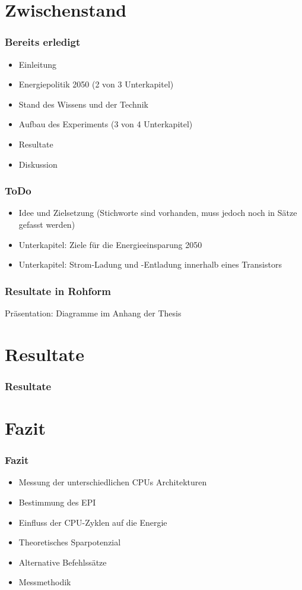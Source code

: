 \documentclass{beamer}
\begin{document}
\section{Zwischenstand} 
\begin{frame}
\frametitle{Bereits erledigt}
\begin{itemize}
\item Einleitung
\item Energiepolitik 2050 (2 von 3 Unterkapitel)
\item Stand des Wissens und der Technik
\item Aufbau des Experiments (3 von 4 Unterkapitel)
\item Resultate
\item Diskussion
\end{itemize}
\end{frame}



\begin{frame}
\frametitle{ToDo}
\begin{itemize}
\item Idee und Zielsetzung (Stichworte sind vorhanden, muss jedoch noch in Sätze gefasst werden)
\item Unterkapitel: Ziele für die Energieeinsparung 2050
\item Unterkapitel: Strom-Ladung und -Entladung innerhalb eines Transistors
\end{itemize}
\end{frame}



\begin{frame}
\frametitle{Resultate in Roh­form} 
\Huge Präsentation: Diagramme im Anhang der Thesis
\end{frame}

\section{Resultate}
\begin{frame}
\frametitle{Resultate} 
\begin{minipage}{0.8\textwidth}


\end{minipage}
\end{frame}



\section{Fazit} 
\begin{frame}
\frametitle{Fazit} 
\begin{itemize}
\item Messung der unterschiedlichen CPUs Architekturen
\item Bestimmung des EPI
\item Einfluss der CPU-Zyklen auf die Energie
\item Theoretisches Sparpotenzial
\item Alternative Befehlssätze
\item Messmethodik
\end{itemize}
\end{frame}
\end{document}
